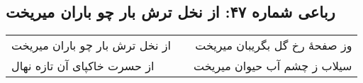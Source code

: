 \begin{center}
\section*{رباعی شماره ۴۷: از نخل ترش بار چو باران میریخت}
\label{sec:sh047}
\begin{longtable}{l p{0.5cm} r}
از نخل ترش بار چو باران میریخت
&&
وز صفحهٔ رخ گل بگریبان میریخت
\\
از حسرت خاکپای آن تازه نهال
&&
سیلاب ز چشم آب حیوان میریخت
\\
\end{longtable}
\end{center}
